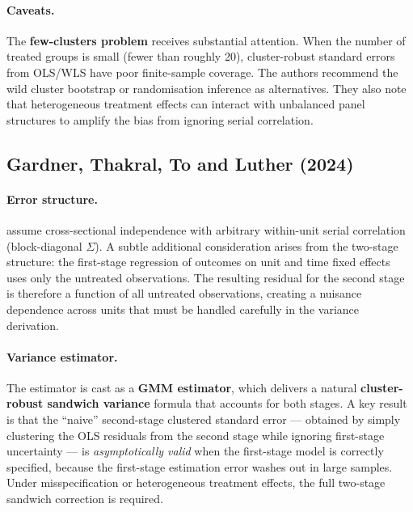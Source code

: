 \documentclass[12pt]{article}
\begin{document}
\paragraph{Caveats.}
The \textbf{few-clusters problem} receives substantial attention.
When the number of treated groups is small (fewer than roughly 20),
cluster-robust standard errors from OLS/WLS have poor finite-sample coverage.
The authors recommend the wild cluster bootstrap or randomisation inference
as alternatives.
They also note that heterogeneous treatment effects can interact with
unbalanced panel structures to amplify the bias from ignoring serial
correlation.

\subsection{Gardner, Thakral, To and Luther (2024)}

\paragraph{Error structure.}
\citet{gardner2024twostage} assume cross-sectional independence with arbitrary
within-unit serial correlation (block-diagonal $\Sigma$).
A subtle additional consideration arises from the two-stage structure: the
first-stage regression of outcomes on unit and time fixed effects uses only
the untreated observations.
The resulting residual for the second stage is therefore a function of all
untreated observations, creating a nuisance dependence across units that must
be handled carefully in the variance derivation.

\paragraph{Variance estimator.}
The estimator is cast as a \textbf{GMM estimator}, which delivers a natural
\textbf{cluster-robust sandwich variance} formula that accounts for both stages.
A key result is that the ``naive'' second-stage clustered standard error ---
obtained by simply clustering the OLS residuals from the second stage while
ignoring first-stage uncertainty --- is \textit{asymptotically valid} when the
first-stage model is correctly specified, because the first-stage estimation
error washes out in large samples.
Under misspecification or heterogeneous treatment effects, the full two-stage
sandwich correction is required.
\end{document}
